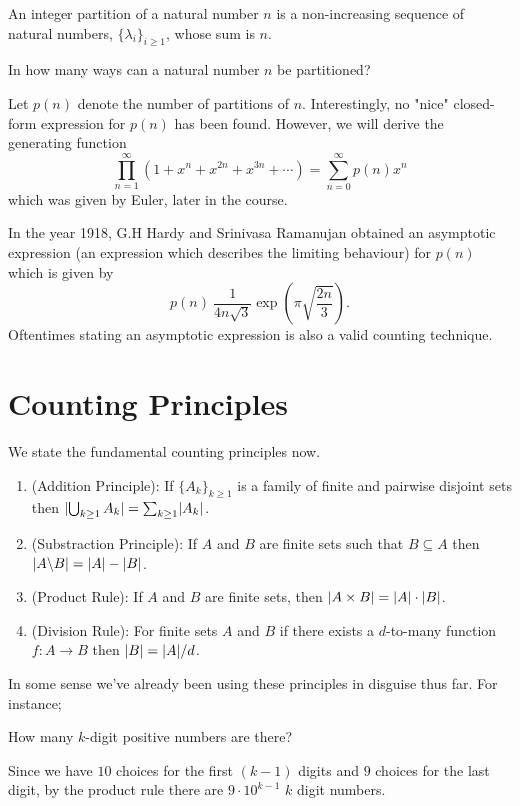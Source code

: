 \begin{definition}
An integer partition of a natural number $n$ is a non-increasing sequence of natural numbers, $\{\lambda_i\}_{i \ge 1}$, whose sum is $n$.
\end{definition}

\begin{question}
In how many ways can a natural number $n$ be partitioned?
\end{question}

Let $p(n)$ denote the number of partitions of $n$. Interestingly, no "nice" closed-form expression for $p(n)$ has been found. However, we will derive the generating function \[
	\prod_{n=1}^\infty\left( 1+x^n +x^{2n}+x^{3n}+\cdots\right) =  \sum_{n=0}^{\infty}p\left( n \right) x^n
\] which was given by Euler, later in the course.

\begin{remark}
	In the year 1918, G.H Hardy and Srinivasa Ramanujan obtained an asymptotic expression (an expression which describes the limiting behaviour) for $p\left( n \right)$ which is given by \[
	p\left( n \right) ~ \frac{1}{4n\sqrt{3}}\exp\left( \pi \sqrt{\frac{2n}{3}}  \right) 
	.\] Oftentimes stating an asymptotic expression is also a valid counting technique.
\end{remark}

\section{Counting Principles}
We state the fundamental counting principles now.
\begin{enumerate}
\item (Addition Principle): If $\{A_{k}\}_{k\geq 1}$ is a family of finite and pairwise disjoint sets then $\lvert\bigcup_{k\geq 1} A_{k}\rvert = \sum_{k\geq 1}\lvert A_{k}\rvert$.
\item (Substraction Principle): If $A$ and $B$ are finite sets such that $B\subseteq A$ then $\lvert A\backslash B\rvert = \lvert A\rvert-\lvert B\rvert$.
\item (Product Rule): If $A$ and $B$ are finite sets, then $\lvert A\times B\rvert = \lvert A\rvert\cdot\lvert B\rvert$.
\item (Division Rule): For finite sets $A$ and $B$ if there exists a $d$-to-many function $f:A\to B$ then $\lvert B\rvert=\lvert A\rvert/d$.
\end{enumerate}
In some sense we've already been using these principles in disguise thus far. For instance;

\begin{question}
	How many $k$-digit positive numbers are there?
\end{question}
Since we have $10$ choices for the first $\left(k-1\right)$ digits and $9$ choices for the last digit, by the product rule there are $9\cdot 10^{k-1}$ $k$ digit numbers.


